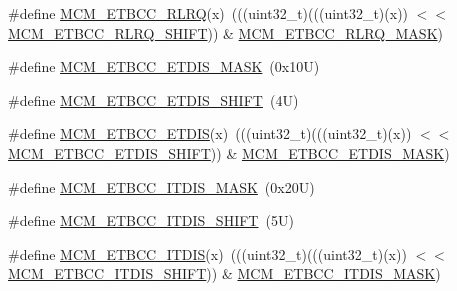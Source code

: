 \begin{DoxyCompactItemize}
\item 
\#define \mbox{\hyperlink{group___m_c_m___register___masks_gae5310b6b9ccbac39628e26dce8f50fb3}{M\+C\+M\+\_\+\+E\+T\+B\+C\+C\+\_\+\+R\+L\+RQ}}(x)~(((uint32\+\_\+t)(((uint32\+\_\+t)(x)) $<$$<$ \mbox{\hyperlink{group___m_c_m___register___masks_ga9ea97398989700f275f186a44b5d86b7}{M\+C\+M\+\_\+\+E\+T\+B\+C\+C\+\_\+\+R\+L\+R\+Q\+\_\+\+S\+H\+I\+FT}})) \& \mbox{\hyperlink{group___m_c_m___register___masks_ga16853921aa4b5ded12e5bf4d2c8509fb}{M\+C\+M\+\_\+\+E\+T\+B\+C\+C\+\_\+\+R\+L\+R\+Q\+\_\+\+M\+A\+SK}})
\item 
\#define \mbox{\hyperlink{group___m_c_m___register___masks_ga4e65e76bc2ffbd1a4577fb31da7e5fbb}{M\+C\+M\+\_\+\+E\+T\+B\+C\+C\+\_\+\+E\+T\+D\+I\+S\+\_\+\+M\+A\+SK}}~(0x10\+U)
\item 
\#define \mbox{\hyperlink{group___m_c_m___register___masks_ga40fefdc2fb703f686abf76fda0ec6859}{M\+C\+M\+\_\+\+E\+T\+B\+C\+C\+\_\+\+E\+T\+D\+I\+S\+\_\+\+S\+H\+I\+FT}}~(4\+U)
\item 
\#define \mbox{\hyperlink{group___m_c_m___register___masks_ga6eb1d37fda4a94c8a878086786bac965}{M\+C\+M\+\_\+\+E\+T\+B\+C\+C\+\_\+\+E\+T\+D\+IS}}(x)~(((uint32\+\_\+t)(((uint32\+\_\+t)(x)) $<$$<$ \mbox{\hyperlink{group___m_c_m___register___masks_ga40fefdc2fb703f686abf76fda0ec6859}{M\+C\+M\+\_\+\+E\+T\+B\+C\+C\+\_\+\+E\+T\+D\+I\+S\+\_\+\+S\+H\+I\+FT}})) \& \mbox{\hyperlink{group___m_c_m___register___masks_ga4e65e76bc2ffbd1a4577fb31da7e5fbb}{M\+C\+M\+\_\+\+E\+T\+B\+C\+C\+\_\+\+E\+T\+D\+I\+S\+\_\+\+M\+A\+SK}})
\item 
\#define \mbox{\hyperlink{group___m_c_m___register___masks_ga390a11a02383ea3369843438b3a5ff80}{M\+C\+M\+\_\+\+E\+T\+B\+C\+C\+\_\+\+I\+T\+D\+I\+S\+\_\+\+M\+A\+SK}}~(0x20\+U)
\item 
\#define \mbox{\hyperlink{group___m_c_m___register___masks_ga92bf57df9f719917686203be01c3d141}{M\+C\+M\+\_\+\+E\+T\+B\+C\+C\+\_\+\+I\+T\+D\+I\+S\+\_\+\+S\+H\+I\+FT}}~(5\+U)
\item 
\#define \mbox{\hyperlink{group___m_c_m___register___masks_gaee134da4c876b2325f87ffa4560a9f96}{M\+C\+M\+\_\+\+E\+T\+B\+C\+C\+\_\+\+I\+T\+D\+IS}}(x)~(((uint32\+\_\+t)(((uint32\+\_\+t)(x)) $<$$<$ \mbox{\hyperlink{group___m_c_m___register___masks_ga92bf57df9f719917686203be01c3d141}{M\+C\+M\+\_\+\+E\+T\+B\+C\+C\+\_\+\+I\+T\+D\+I\+S\+\_\+\+S\+H\+I\+FT}})) \& \mbox{\hyperlink{group___m_c_m___register___masks_ga390a11a02383ea3369843438b3a5ff80}{M\+C\+M\+\_\+\+E\+T\+B\+C\+C\+\_\+\+I\+T\+D\+I\+S\+\_\+\+M\+A\+SK}})
\end{DoxyCompactItemize}
